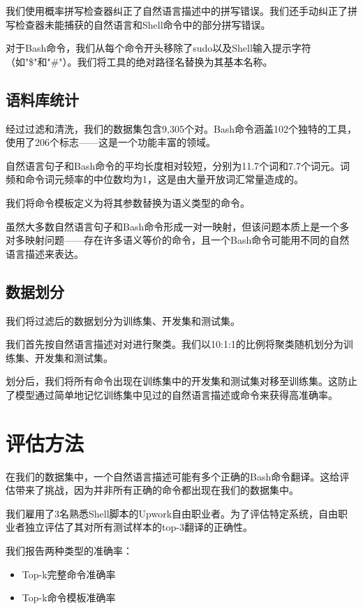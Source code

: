 我们使用概率拼写检查器纠正了自然语言描述中的拼写错误。我们还手动纠正了拼写检查器未能捕获的自然语言和Shell命令中的部分拼写错误。

对于Bash命令，我们从每个命令开头移除了sudo以及Shell输入提示字符（如"\$"和"\#"）。我们将工具的绝对路径名替换为其基本名称。

\subsection{语料库统计}

经过过滤和清洗，我们的数据集包含9,305个对。Bash命令涵盖102个独特的工具，使用了206个标志——这是一个功能丰富的领域。

自然语言句子和Bash命令的平均长度相对较短，分别为11.7个词和7.7个词元。词频和命令词元频率的中位数均为1，这是由大量开放词汇常量造成的。

我们将命令模板定义为将其参数替换为语义类型的命令。

虽然大多数自然语言句子和Bash命令形成一对一映射，但该问题本质上是一个多对多映射问题——存在许多语义等价的命令，且一个Bash命令可能用不同的自然语言描述来表达。

\subsection{数据划分}

我们将过滤后的数据划分为训练集、开发集和测试集。

我们首先按自然语言描述对对进行聚类。我们以10:1:1的比例将聚类随机划分为训练集、开发集和测试集。

划分后，我们将所有命令出现在训练集中的开发集和测试集对移至训练集。这防止了模型通过简单地记忆训练集中见过的自然语言描述或命令来获得高准确率。

\section{评估方法}

在我们的数据集中，一个自然语言描述可能有多个正确的Bash命令翻译。这给评估带来了挑战，因为并非所有正确的命令都出现在我们的数据集中。

我们雇用了3名熟悉Shell脚本的Upwork自由职业者。为了评估特定系统，自由职业者独立评估了其对所有测试样本的top-3翻译的正确性。

我们报告两种类型的准确率：

\begin{itemize}
    \item Top-k完整命令准确率
    \item Top-k命令模板准确率
\end{itemize}

